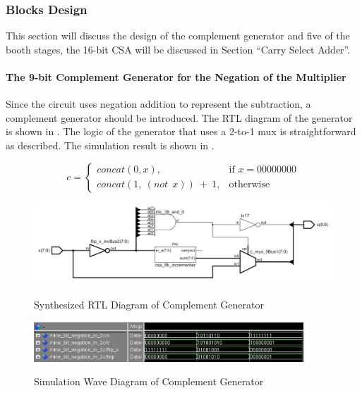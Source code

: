 \subsubsection{Blocks Design}

This section will discuss the design of the complement generator and five of the booth stages,
the 16-bit CSA will be discussed in Section “Carry Select Adder”.

\paragraph{The 9-bit Complement Generator for the Negation of the Multiplier}
Since the circuit uses negation addition to represent the subtraction, a complement generator should be introduced.
The RTL diagram of the generator is shown in .
The logic of the generator that uses a 2-to-1 mux is straightforward as  described.
The simulation result is shown in .

\begin{equation}
	c =
	\begin{cases}
		concat(0, x),                 & \text{if } x = 00000000 \\
		concat(1,\ (not\ \ x))\ +\ 1, & \text{otherwise}
	\end{cases}
	\label{exp:complementor_exp}
\end{equation}

\begin{figure}[!ht]
	\centering
	\caption{Synthesized RTL Diagram of Complement Generator}
	\includegraphics[width=\textwidth]{../img/complementor_rtl.png}
	\label{fig:complementor_rtl}
\end{figure}

\begin{figure}[!ht]
	\centering
	\caption{Simulation Wave Diagram of Complement Generator}
	\includegraphics[width=0.9\textwidth]{../img/complementor_sim.png}
	\label{fig:complementor_sim}
\end{figure}

